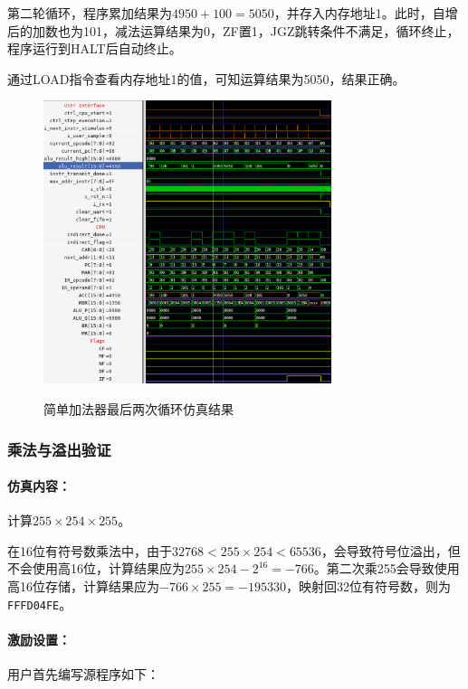 \documentclass[lang=cn,a4paper,newtx]{elegantpaper}
\begin{document}
第二轮循环，程序累加结果为$4950+100 = 5050$，并存入内存地址1。此时，自增后的加数也为101，减法运算结果为0，ZF置1，JGZ跳转条件不满足，循环终止，程序运行到HALT后自动终止。

通过LOAD指令查看内存地址1的值，可知运算结果为5050，结果正确。

\begin{figure}[htbp]
  \centering
  \caption{简单加法器最后两次循环仿真结果}
  \includegraphics[width = 0.75\textwidth]{figure/cpu_sim_add.png}
  \label{fig:sim:1}
\end{figure}


\subsubsection{乘法与溢出验证}\label{sec:mul:overflow}
\paragraph{仿真内容：}

计算$255\times254\times255$。

在16位有符号数乘法中，由于$32768 < 255\times254 < 65536$，会导致符号位溢出，但不会使用高16位，计算结果应为$255 \times 254 -2 ^{16}= -766$。第二次乘255会导致使用高16位存储，计算结果应为$-766 \times 255 = -195330$，映射回32位有符号数，则为\texttt{FFFD04FE}。 


\paragraph{激励设置：}

用户首先编写源程序如下：

\end{document}
